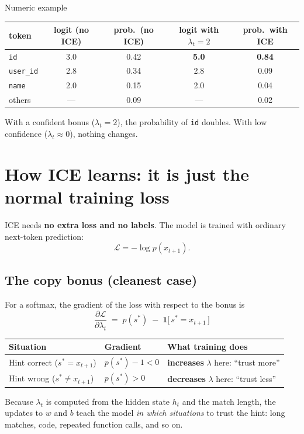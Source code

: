 \documentclass[11pt]{article}
\begin{document}
\begin{example}{Numeric example}
\begin{center}
\begin{tabular}{@{}lcccc@{}}
\toprule
token & logit (no ICE) & prob.\ (no ICE) & logit with $\lambda_t = 2$ & prob.\ with ICE \\
\midrule
\texttt{id}      & 3.0 & 0.42 & \textbf{5.0} & \textbf{0.84} \\
\texttt{user\_id} & 2.8 & 0.34 & 2.8 & 0.09 \\
\texttt{name}    & 2.0 & 0.15 & 2.0 & 0.04 \\
others           & ---  & 0.09 & --- & 0.02 \\
\bottomrule
\end{tabular}
\end{center}
With a confident bonus ($\lambda_t = 2$), the probability of \texttt{id} doubles. With low confidence ($\lambda_t \approx 0$), nothing changes.
\end{example}

\section{How ICE learns: it is just the normal training loss}

ICE needs \textbf{no extra loss and no labels}. The model is trained with ordinary next-token prediction:
\[
\mathcal{L} = -\log p(x_{t+1}).
\]

\subsection*{The copy bonus (cleanest case)}
For a softmax, the gradient of the loss with respect to the bonus is
\[
\boxed{\, \frac{\partial \mathcal{L}}{\partial \lambda_t} \;=\; p(s^*) \;-\; \mathbf{1}\big[\, s^* = x_{t+1} \,\big] \,}
\]
\begin{center}
\begin{tabular}{@{}lll@{}}
\toprule
Situation & Gradient & What training does \\
\midrule
Hint correct ($s^* = x_{t+1}$) & $p(s^*) - 1 < 0$ & \textbf{increases} $\lambda$ here: ``trust more'' \\
Hint wrong ($s^* \ne x_{t+1}$) & $p(s^*) > 0$ & \textbf{decreases} $\lambda$ here: ``trust less'' \\
\bottomrule
\end{tabular}
\end{center}
Because $\lambda_t$ is computed from the hidden state $h_t$ and the match length, the updates to $w$ and $b$ teach the model \emph{in which situations} to trust the hint: long matches, code, repeated function calls, and so on.
\end{document}
